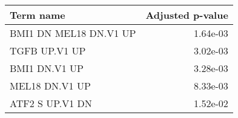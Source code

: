 \begin{tabular}{lr}
\toprule
              Term name &  Adjusted p-value \\
\midrule
 BMI1 DN MEL18 DN.V1 UP &          1.64e-03 \\
          TGFB UP.V1 UP &          3.02e-03 \\
          BMI1 DN.V1 UP &          3.28e-03 \\
         MEL18 DN.V1 UP &          8.33e-03 \\
        ATF2 S UP.V1 DN &          1.52e-02 \\
\bottomrule
\end{tabular}
